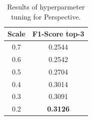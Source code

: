 \begin{table}
    \caption{Results of hyperparmeter tuning for Perspective.}
    \label{tab:perspective_hp}
    \centering
    \small
    \tabcolsep=0.11cm
    \begin{tabular}{|c|c|}
    \hline
    Scale & F1-Score top-3 \\ \hline
        0.7 & 0.2544 \\
        0.6 & 0.2542 \\
        0.5 & 0.2704 \\
        0.4 & 0.3014 \\
        0.3 & 0.3091 \\
        0.2 & \textbf{0.3126} \\ \hline
    \end{tabular}

\end{table}

